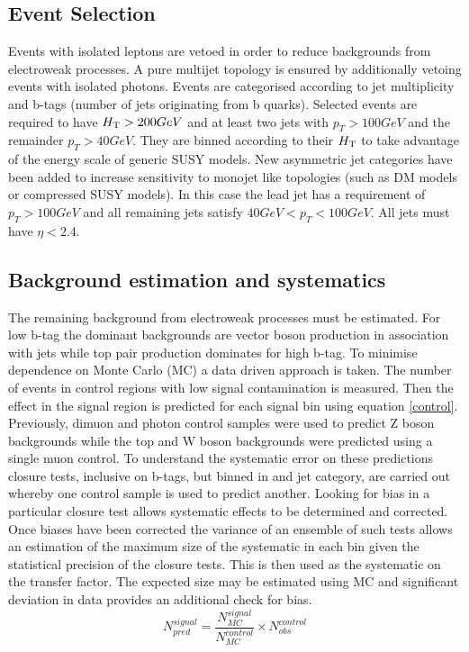 \subsection{Event Selection}
Events with isolated leptons are vetoed in order to reduce backgrounds from electroweak processes. 
A pure multijet topology is ensured by additionally vetoing events with isolated photons. 
Events are categorised according to jet multiplicity and b-tags (number of jets originating from b quarks). 
Selected events are required to have $\mbox{$H_\text{T}$} > 200 GeV$ and at least two jets with $p_T > 100GeV$ and the
remainder $p_T > 40GeV$. They are binned according to their $\mbox{$H_\text{T}$}$ to take advantage of the energy scale of generic SUSY models. New asymmetric jet categories have been added to increase sensitivity to monojet like
topologies (such as DM models or compressed SUSY models). 
In this case the lead jet has a requirement of 
$p_T > 100 GeV$ and all remaining jets 
satisfy $40 GeV < p_T < 100GeV$. 
All jets must have $\eta < 2.4$.

\subsection{Background estimation and systematics}
\label{sec:bkgd-est}
The remaining background from electroweak processes must 
be estimated. For low b-tag the dominant backgrounds are 
vector boson production in association with jets while 
top pair production dominates for high b-tag. To minimise 
dependence on Monte Carlo (MC) a data driven approach is 
taken. The number of events in control regions with low
signal contamination is measured. Then the effect in the 
signal region is predicted for each signal bin using 
equation \ref{control}. Previously, dimuon and photon control 
samples were used to predict Z boson backgrounds while the top 
and W boson backgrounds were predicted using a single muon control. 
To understand the systematic error on these predictions 
closure tests, inclusive on b-tags, but binned in \scalht and jet category, are carried out whereby one control sample 
is used to predict another. Looking for bias in a 
particular closure test allows systematic effects to be 
determined and corrected. Once biases have been 
corrected the variance of an ensemble of such tests 
allows an estimation 
of the maximum size of the systematic in each bin given 
the statistical precision of the closure tests. This is 
then used as the systematic on the transfer factor. The 
expected size may be estimated using MC and 
significant deviation in data provides an additional 
check for bias.   
\begin{equation}
\label{control}
N_{pred}^{signal}=\frac{N_{MC}^{signal}}{N_{MC}^{control}}\times N^{control}_{obs}
\end{equation} 
